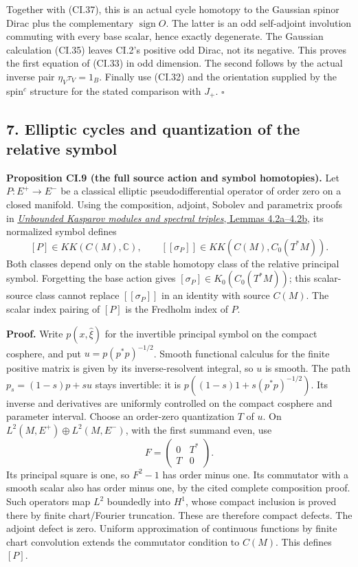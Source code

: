 \documentclass[
  11pt,
]{article}
\begin{document}
Together with (CI.37), this is an actual cycle homotopy to the Gaussian
spinor Dirac plus the complementary \(\operatorname{sign}O\). The latter
is an odd self-adjoint involution commuting with every base scalar,
hence exactly degenerate. The Gaussian calculation (CI.35) leaves CI.2's
positive odd Dirac, not its negative. This proves the first equation of
(CI.33) in odd dimension. The second follows by the actual inverse pair
\(\eta_V\tau_V=1_B\). Finally use (CI.32) and the orientation supplied
by the spin\(^{c}\) structure for the stated comparison with \(J_+\).
\(\square\)

\subsection{7. Elliptic cycles and quantization of the relative
symbol}\label{elliptic-cycles-and-quantization-of-the-relative-symbol}

\textbf{Proposition CI.9 (the full source action and symbol
homotopies).} Let \(P:E^+\to E^-\) be a classical elliptic
pseudodifferential operator of order zero on a closed manifold. Using
the composition, adjoint, Sobolev and parametrix proofs in
\href{KT-KK-11.html\#4-spectral-triples-and-the-circle}{\emph{Unbounded
Kasparov modules and spectral triples}, Lemmas 4.2a--4.2b}, its
normalized symbol defines \[
 [P]\in KK(C(M),\mathbb C),\qquad
 [\![\sigma_P]\!]\in KK(C(M),C_0(T^*M)).
 \tag{CI.38}
\] Both classes depend only on the stable homotopy class of the relative
principal symbol. Forgetting the base action gives
\([\sigma_P]\in K_0(C_0(T^*M))\); this scalar-source class cannot
replace \([\![\sigma_P]\!]\) in an identity with source \(C(M)\). The
scalar index pairing of \([P]\) is the Fredholm index of \(P\).

\textbf{Proof.} Write \(p(x,\widehat\xi)\) for the invertible principal
symbol on the compact cosphere, and put \(u=p(p^*p)^{-1/2}\). Smooth
functional calculus for the finite positive matrix is given by its
inverse-resolvent integral, so \(u\) is smooth. The path
\(p_s=(1-s)p+su\) stays invertible: it is \(p((1-s)1+s(p^*p)^{-1/2})\).
Its inverse and derivatives are uniformly controlled on the compact
cosphere and parameter interval. Choose an order-zero quantization \(T\)
of \(u\). On \(L^2(M,E^+)\oplus L^2(M,E^-)\), with the first summand
even, use \[
 F=\begin{pmatrix}0&T^*\\T&0\end{pmatrix}.
\] Its principal square is one, so \(F^2-1\) has order minus one. Its
commutator with a smooth scalar also has order minus one, by the cited
complete composition proof. Such operators map \(L^2\) boundedly into
\(H^1\), whose compact inclusion is proved there by finite chart/Fourier
truncation. These are therefore compact defects. The adjoint defect is
zero. Uniform approximation of continuous functions by finite chart
convolution extends the commutator condition to \(C(M)\). This defines
\([P]\).
\end{document}
